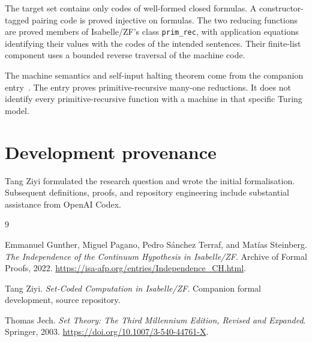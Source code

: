 \documentclass[11pt,a4paper]{article}
\begin{document}
The target set contains only codes of well-formed closed formulas. A
constructor-tagged pairing code is proved injective on formulas. The two
reducing functions are proved members of Isabelle/ZF's class
\texttt{prim\_rec}, with application equations identifying their values
with the codes of the intended sentences. Their finite-list component uses
a bounded reverse traversal of the machine code.

The machine semantics and self-input halting theorem come from the companion
entry~\cite{afp-core}. The entry proves primitive-recursive many-one
reductions. It does not identify every primitive-recursive function with a
machine in that specific Turing model.



\section*{Development provenance}
Tang Ziyi formulated the research question and wrote the initial
formalisation. Subsequent definitions, proofs, and repository engineering
include substantial assistance from OpenAI Codex.

\begin{thebibliography}{9}

Emmanuel Gunther, Miguel Pagano, Pedro S\'anchez Terraf, and Mat\'ias Steinberg.
\emph{The Independence of the Continuum Hypothesis in Isabelle/ZF}.
Archive of Formal Proofs, 2022.
\url{https://isa-afp.org/entries/Independence_CH.html}.

Tang Ziyi.
\emph{Set-Coded Computation in Isabelle/ZF}.
Companion formal development, source repository.

Thomas Jech.
\emph{Set Theory: The Third Millennium Edition, Revised and Expanded}.
Springer, 2003.
\url{https://doi.org/10.1007/3-540-44761-X}.

\end{thebibliography}
\end{document}
